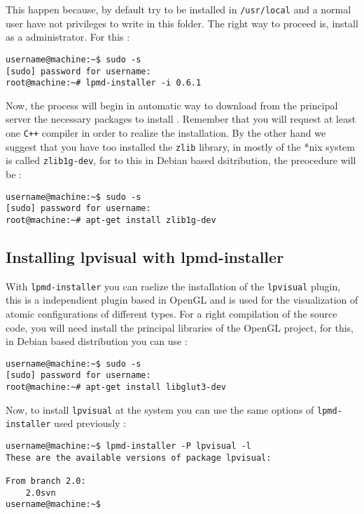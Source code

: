 This happen because, {\lpmd} by default try to be installed in
\verb|/usr/local| and a normal user have not privileges to write in this
folder. The right way to proceed is, install as a administrator. For this :

\begin{verbatim}
username@machine:~$ sudo -s
[sudo] password for username: 
root@machine:~# lpmd-installer -i 0.6.1
\end{verbatim}

Now, the process will begin in automatic way to download from the principal
server the necessary packages to install {\lpmd}. Remember that you will
request at least one \verb|C++| compiler in order to realize the installation.
By the other hand we suggest that you have too installed the \verb|zlib|
library, in mostly of the *nix system is called \verb|zlib1g-dev|, for to this
in Debian based dsitribution, the preocedure will be :

\begin{verbatim}
username@machine:~$ sudo -s
[sudo] password for username: 
root@machine:~# apt-get install zlib1g-dev
\end{verbatim}


\subsection{Installing lpvisual with lpmd-installer}

With \verb|lpmd-installer| you can raelize the installation of the
\verb|lpvisual| plugin, this is a independient plugin based in OpenGL and is
used for the visualization of atomic configurations of different types. For a
right compilation of the source code, you will need install the principal
libraries of the OpenGL project, for this, in Debian based distribution you can
use :

\begin{verbatim}
username@machine:~$ sudo -s
[sudo] password for username: 
root@machine:~# apt-get install libglut3-dev
\end{verbatim}

Now, to install \verb|lpvisual| at the system you can use the same options of
\verb|lpmd-installer| used previously :

\begin{verbatim}
username@machine:~$ lpmd-installer -P lpvisual -l
These are the available versions of package lpvisual:

From branch 2.0: 
    2.0svn
username@machine:~$  
\end{verbatim}

